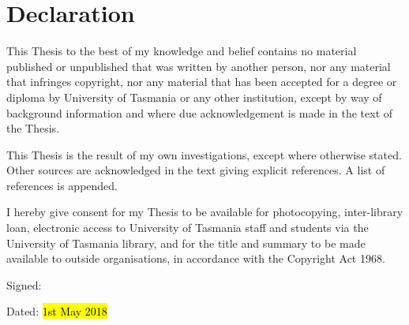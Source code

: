 \chapter{Declaration}

This Thesis to the best of my knowledge and belief contains no material published or unpublished that was written by another person, nor any material that infringes copyright, nor any material that has been accepted for a degree or diploma by University of Tasmania or any other institution, except by way of background information and where due acknowledgement is made in the text of the Thesis.

This Thesis is the result of my own investigations, except where otherwise stated. Other sources are acknowledged in the text giving explicit references. A list of references is appended.


I hereby give consent for my Thesis to be available for photocopying, inter-library loan, electronic access to University of Tasmania staff and students via the University of Tasmania library, and for the title and summary to be made available to outside organisations, in accordance with the Copyright Act 1968.


   \bigskip
   \bigskip

Signed:

   \bigskip
   \bigskip

Dated: \hl{ 1st May 2018 }      %